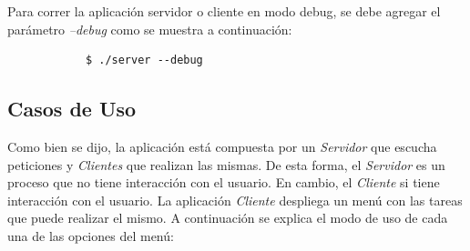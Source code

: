 \documentclass[a4paper,10pt]{article}
\begin{document}
		Para correr la aplicaci\'on servidor o cliente en modo debug, se debe agregar el par\'ametro \emph{--debug} como se muestra a continuaci\'on:
		\begin{verbatim}
			$ ./server --debug
		\end{verbatim}

		\subsection{Casos de Uso}

			Como bien se dijo, la aplicaci\'on est\'a compuesta por un \emph{Servidor} que escucha peticiones y \emph{Clientes} que realizan las mismas. 
			De esta forma, el \emph{Servidor} es un proceso que no tiene interacci\'on con el usuario. En cambio, el \emph{Cliente} si tiene interacci\'on
			con el usuario. La aplicaci\'on \emph{Cliente} despliega un men\'u con las tareas que puede realizar el mismo. A continuaci\'on se 
			explica el modo de uso de cada una de las opciones del men\'u: 
\end{document}
